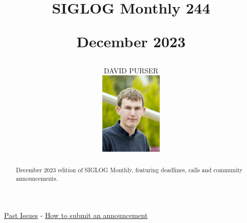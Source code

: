\documentclass[prodmode,acmtecs]{acmsmall} %
\newcounter{colstart}
\begin{document}
\setcounter{colstart}{\thepage}

\title{{\huge\sc SIGLOG Monthly 244}

 December 2023}
\author{DAVID PURSER
\vspace*{-2.6cm}\begin{flushright}\includegraphics[width=30mm]{dp}\end{flushright}
}

\begin{abstract}
December 2023 edition of SIGLOG Monthly, featuring deadlines, calls and community announcements.
\end{abstract}


\maketitlee

\href{https://lics.siglog.org/newsletters/}{Past Issues}
 - 
\href{https://lics.siglog.org/newsletters/inst.html}{How to submit an announcement}
\end{document}
